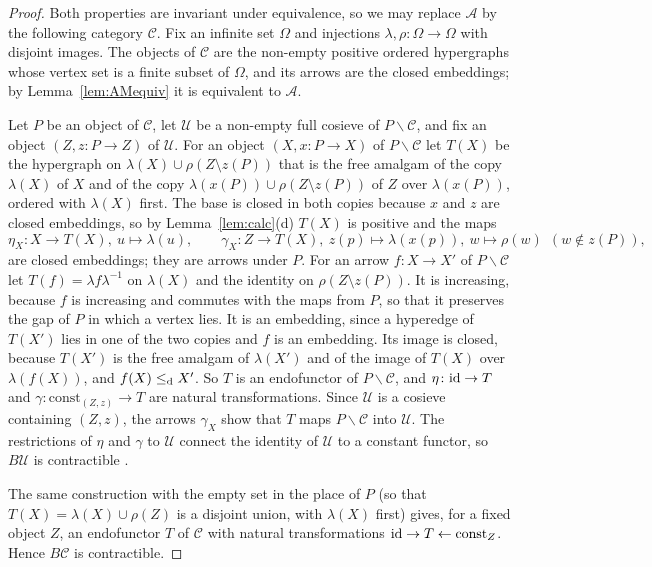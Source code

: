 \begin{proof}
Both properties are invariant under equivalence, so we may replace $\mathcal A$
by the following category $\mathcal C$. Fix an infinite set $\Omega$ and
injections $\lambda,\rho\colon\Omega\to\Omega$ with disjoint images. The objects
of $\mathcal C$ are the non-empty positive ordered hypergraphs whose vertex set
is a finite subset of $\Omega$, and its arrows are the closed embeddings; by
Lemma~\ref{lem:AMequiv} it is equivalent to $\mathcal A$.

Let $P$ be an object of $\mathcal C$, let $\mathcal U$ be a non-empty full
cosieve of $P\backslash\mathcal C$, and fix an object $(Z,z\colon P\to Z)$ of
$\mathcal U$. For an object $(X,x\colon P\to X)$ of $P\backslash\mathcal C$ let
$T(X)$ be the hypergraph on $\lambda(X)\cup\rho(Z\setminus z(P))$ that is the free
amalgam of the copy $\lambda(X)$ of $X$ and of the copy
$\lambda(x(P))\cup\rho(Z\setminus z(P))$ of $Z$ over $\lambda(x(P))$, ordered
with $\lambda(X)$ first. The base is closed in both copies because $x$ and
$z$ are closed embeddings, so by Lemma~\ref{lem:calc}(d) $T(X)$ is positive and
the maps
\[
 \eta_X\colon X\to T(X),\ u\mapsto\lambda(u),\qquad
 \gamma_X\colon Z\to T(X),\ z(p)\mapsto\lambda(x(p)),\ w\mapsto\rho(w)\ \
 (w\notin z(P)),
\]
are closed embeddings; they are arrows under $P$. For an arrow
$f\colon X\to X'$ of $P\backslash\mathcal C$ let
$T(f)=\lambda f\lambda^{-1}$ on $\lambda(X)$ and the identity on
$\rho(Z\setminus z(P))$. It is increasing, because $f$ is increasing and
commutes with the maps from $P$, so that it preserves the gap of $P$ in which a
vertex lies. It is an embedding, since a hyperedge of $T(X')$ lies in one of
the two copies and $f$ is an embedding. Its image is closed, because $T(X')$
is the free amalgam of $\lambda(X')$ and of the image of $T(X)$ over
$\lambda(f(X))$, and $f(X)\leq_{\mathrm{d}} X'$. So $T$ is an endofunctor of
$P\backslash\mathcal C$, and $\eta\colon\mathrm{id}\to T$ and
$\gamma\colon\mathrm{const}_{(Z,z)}\to T$ are natural transformations. Since
$\mathcal U$ is a cosieve containing $(Z,z)$, the arrows $\gamma_X$ show that
$T$ maps $P\backslash\mathcal C$ into $\mathcal U$. The restrictions of $\eta$
and $\gamma$ to $\mathcal U$ connect the identity of $\mathcal U$ to a constant
functor, so $B\mathcal U$ is contractible \cite[\S 1, Proposition~2]{Quillen}.

The same construction with the empty set in the place of $P$ (so that
$T(X)=\lambda(X)\cup\rho(Z)$ is a disjoint union, with $\lambda(X)$ first)
gives, for a fixed object $Z$, an endofunctor $T$ of $\mathcal C$ with natural
transformations $\mathrm{id}\to T\leftarrow\mathrm{const}_Z$. Hence $B\mathcal C$ is
contractible.
\end{proof}

